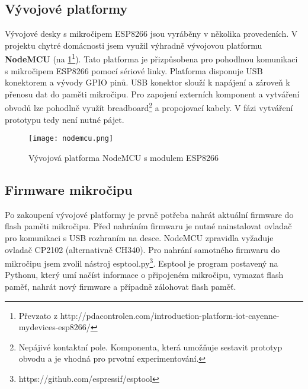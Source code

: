 \subsection*{Vývojové platformy}
Vývojové desky s mikročipem ESP8266 jsou vyráběny v několika provedeních. V projektu chytré domácnosti jsem využil výhradně vývojovou platformu \textbf{NodeMCU} (na \cref{fig:nodemcu}\footnote{Převzato z http://pdacontrolen.com/introduction-platform-iot-cayenne-mydevices-esp8266/}). Tato platforma je přizpůsobena pro pohodlnou komunikaci s mikročipem ESP8266 pomocí sériové linky. Platforma disponuje USB konektorem a vývody GPIO pinů. USB konektor slouží k napájení a zároveň k přenosu dat do paměti mikročipu. Pro zapojení externích komponent a vytváření obvodů lze pohodlně využít breadboard\footnote{Nepájivé kontaktní pole. Komponenta, která umožňuje sestavit prototyp obvodu a je vhodná pro prvotní experimentování.} a propojovací kabely. V fázi vytváření prototypu tedy není nutné pájet.

\begin{figure}[H]
  \centering
  \texttt{[image: nodemcu.png]}
  \caption{Vývojová platforma NodeMCU s modulem ESP8266}
  \label{fig:nodemcu}
\end{figure}

\subsection*{Firmware mikročipu}
Po zakoupení vývojové platformy je prvně potřeba nahrát aktuální firmware do flash paměti mikročipu. Před nahráním firmwaru je nutné nainstalovat ovladač pro komunikaci s USB rozhraním na desce. NodeMCU zpravidla vyžaduje ovladač CP2102 (alternativně CH340). Pro nahrání samotného firmwaru do mikročipu jsem zvolil nástroj esptool.py\footnote{https://github.com/espressif/esptool}. Esptool je program postavený na Pythonu, který umí načíst informace o připojeném mikročipu, vymazat flash paměť, nahrát nový firmware a případně zálohovat flash paměť.

